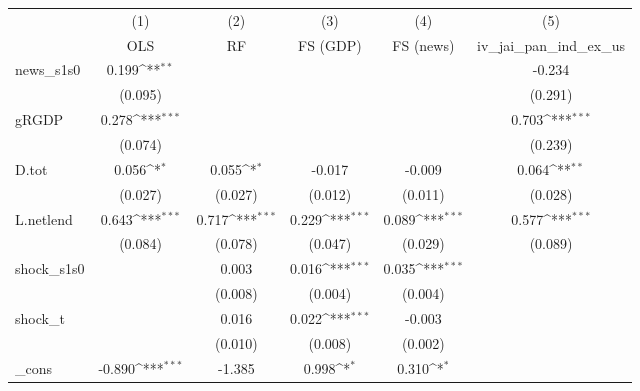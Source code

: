 {
\def\sym#1{\ifmmode^{#1}\else\(^{#1}\)\fi}
\begin{tabular}{l*{5}{c}}
\toprule
            &\multicolumn{1}{c}{(1)}&\multicolumn{1}{c}{(2)}&\multicolumn{1}{c}{(3)}&\multicolumn{1}{c}{(4)}&\multicolumn{1}{c}{(5)}\\
            &\multicolumn{1}{c}{OLS}&\multicolumn{1}{c}{RF}&\multicolumn{1}{c}{FS (GDP)}&\multicolumn{1}{c}{FS (news)}&\multicolumn{1}{c}{iv\_jai\_pan\_ind\_ex\_us}\\
\midrule
news\_s1s0   &       0.199\sym{**} &                     &                     &                     &      -0.234         \\
            &     (0.095)         &                     &                     &                     &     (0.291)         \\
\addlinespace
gRGDP       &       0.278\sym{***}&                     &                     &                     &       0.703\sym{***}\\
            &     (0.074)         &                     &                     &                     &     (0.239)         \\
\addlinespace
D.tot       &       0.056\sym{*}  &       0.055\sym{*}  &      -0.017         &      -0.009         &       0.064\sym{**} \\
            &     (0.027)         &     (0.027)         &     (0.012)         &     (0.011)         &     (0.028)         \\
\addlinespace
L.netlend   &       0.643\sym{***}&       0.717\sym{***}&       0.229\sym{***}&       0.089\sym{***}&       0.577\sym{***}\\
            &     (0.084)         &     (0.078)         &     (0.047)         &     (0.029)         &     (0.089)         \\
\addlinespace
shock\_s1s0  &                     &       0.003         &       0.016\sym{***}&       0.035\sym{***}&                     \\
            &                     &     (0.008)         &     (0.004)         &     (0.004)         &                     \\
\addlinespace
shock\_t     &                     &       0.016         &       0.022\sym{***}&      -0.003         &                     \\
            &                     &     (0.010)         &     (0.008)         &     (0.002)         &                     \\
\addlinespace
\_cons      &      -0.890\sym{***}&      -1.385         &       0.998\sym{*}  &       0.310\sym{*}  &                     \\

\end{tabular}}
